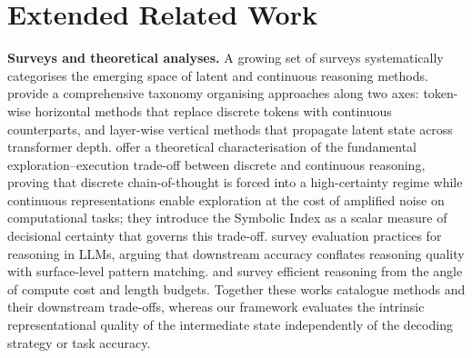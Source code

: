 \section{Extended Related Work}
\label{appendix:extended_related_work}

\textbf{Surveys and theoretical analyses.}
A growing set of surveys systematically categorises the emerging space of latent and continuous reasoning methods. \citet{chen2025reasoninglanguagecomprehensivesurvey} provide a comprehensive taxonomy organising approaches along two axes: token-wise horizontal methods that replace discrete tokens with continuous counterparts, and layer-wise vertical methods that propagate latent state across transformer depth. \citet{zou2026the} offer a theoretical characterisation of the fundamental exploration--execution trade-off between discrete and continuous reasoning, proving that discrete chain-of-thought is forced into a high-certainty regime while continuous representations enable exploration at the cost of amplified noise on computational tasks; they introduce the Symbolic Index as a scalar measure of decisional certainty that governs this trade-off. \citet{mondorf2024accuracyevaluatingreasoningbehavior} survey evaluation practices for reasoning in LLMs, arguing that downstream accuracy conflates reasoning quality with surface-level pattern matching. \citet{sui2025stopoverthinkingsurveyefficient} and \citet{feng2025efficientreasoningmodelssurvey} survey efficient reasoning from the angle of compute cost and length budgets. Together these works catalogue methods and their downstream trade-offs, whereas our framework evaluates the intrinsic representational quality of the intermediate state independently of the decoding strategy or task accuracy.

